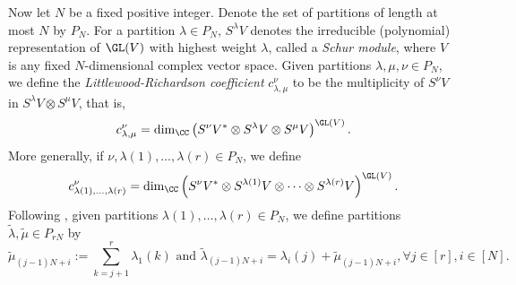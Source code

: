 Now let $N$ be a fixed positive integer. Denote the set of partitions of length at most $N$ by $P_N$. For a partition $\lambda \in P_N$,  $S^\lambda V$ denotes the irreducible (polynomial) representation of $\GL(V)$ with highest weight $\lambda$, called a \emph{Schur module}, where $V$ is any fixed $N$-dimensional complex vector space.  Given partitions $\lambda, \mu, \nu \in P_N$, we define the \emph{Littlewood-Richardson coefficient} $c^\nu_{\lambda, \mu}$ to be the multiplicity of $S^\nu V$ in $S^\lambda V \otimes S^\mu V$, that is,
\[
c^\nu_{\lambda,\mu} = \dim_\CC \left( S^\nu V^* \otimes S^\lambda V \otimes S^\mu V\right)^{\GL(V)}.
\]
More generally, if $\nu, \lambda(1), \ldots, \lambda(r) \in P_N$, we define
\[
c^\nu_{\lambda(1),\ldots, \lambda(r)} = \dim_\CC \left(S^\nu V^* \otimes S^{\lambda(1)} V \otimes \cdots \otimes S^{\lambda(r)} V\right)^{\GL(V)}.
\]
Following \cite{Zel-1999}, given partitions $\lambda(1), \ldots, \lambda(r) \in P_N$, we define partitions $\widetilde{\lambda}, \widetilde{\mu} \in P_{rN}$ by
\begin{equation}\label{Zel-trick-eqns}
\widetilde{\mu}_{(j-1)N+i}:=\sum_{k=j+1}^r \lambda_1(k) \text{~and~} \widetilde{\lambda}_{(j-1)N+i}=\lambda_i(j)+\widetilde{\mu}_{(j-1)N+i}, \forall j \in [r], i \in [N].
\end{equation}

